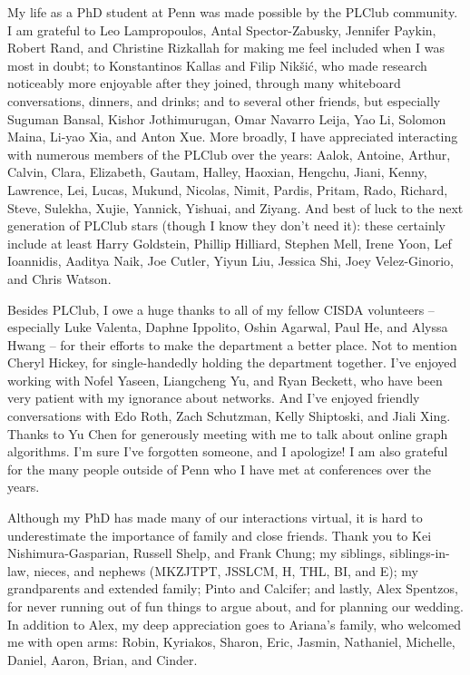 My life as a PhD student at Penn was made possible by the PLClub community.
I am grateful to Leo Lampropoulos, Antal Spector-Zabusky, Jennifer Paykin, Robert Rand, and Christine Rizkallah for making me feel included when I was most in doubt;
to Konstantinos Kallas and Filip Nikšić, who made research noticeably more enjoyable after they joined, through many whiteboard conversations, dinners, and drinks;
and to several other friends, but especially Suguman Bansal, Kishor Jothimurugan, Omar Navarro Leija, Yao Li, Solomon Maina, Li-yao Xia, and Anton Xue.
More broadly, I have appreciated interacting with numerous members of the PLClub over the years:
Aalok, Antoine, Arthur, Calvin, Clara, Elizabeth, Gautam, Halley, Haoxian, Hengchu, Jiani, Kenny, Lawrence, Lei, Lucas, Mukund, Nicolas, Nimit, Pardis, Pritam, Rado, Richard, Steve, Sulekha, Xujie, Yannick, Yishuai, and Ziyang.
And best of luck to the next generation of PLClub stars
(though I know they don't need it):
these certainly include at least
Harry Goldstein,
Phillip Hilliard,
Stephen Mell,
Irene Yoon,
Lef Ioannidis,
Aaditya Naik,
Joe Cutler,
Yiyun Liu,
Jessica Shi,
Joey Velez-Ginorio,
and Chris Watson.

Besides PLClub, I owe a huge thanks to all of my fellow CISDA volunteers -- especially Luke Valenta, Daphne Ippolito, Oshin Agarwal, Paul He, and Alyssa Hwang -- for their efforts to make the department a better place.
Not to mention Cheryl Hickey, for single-handedly holding the department together.
I've enjoyed working with Nofel Yaseen, Liangcheng Yu, and Ryan Beckett, who have been very patient with my ignorance about networks.
And I've enjoyed friendly conversations with Edo Roth, Zach Schutzman, Kelly Shiptoski, and Jiali Xing.
Thanks to Yu Chen for generously meeting with me to talk about online graph algorithms.
I'm sure I've forgotten someone, and I apologize!
I am also grateful for the many people outside of Penn who I have met at conferences over the years.

Although my PhD has made many of our interactions virtual, it is hard to underestimate the importance of family and close friends.
Thank you to Kei Nishimura-Gasparian, Russell Shelp, and Frank Chung; my siblings, siblings-in-law, nieces, and nephews (MKZJTPT, JSSLCM, H, THL, BI, and E); my grandparents and extended family; Pinto and Calcifer;
and lastly, Alex Spentzos, for never running out of fun things to argue about, and for planning our wedding. In addition to Alex, my deep appreciation goes to Ariana's family, who welcomed me with open arms: Robin, Kyriakos, Sharon, Eric, Jasmin, Nathaniel, Michelle, Daniel, Aaron, Brian, and Cinder.

